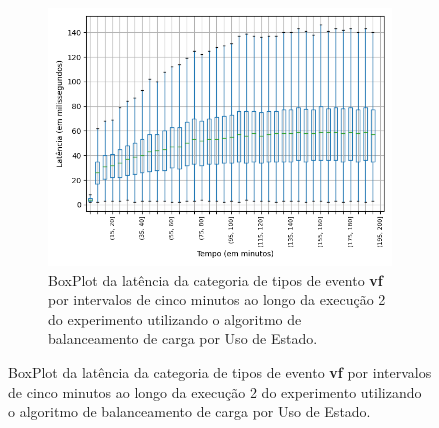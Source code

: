 

\begin{figure}
\centering
\begin{subfigure}{.5\textwidth}
\centering
\includegraphics[width=\textwidth]{figuras/graphics/boxplot_7-dez-su_vf.png}
\caption{BoxPlot da latência da categoria de tipos de evento \textbf{vf} por intervalos de cinco minutos ao longo da execução 2 do experimento utilizando o algoritmo de balanceamento de carga por Uso de Estado.}
\label{fig:BoxPlot_vf_SU_7-dez-su}
\end{subfigure}%


\end{figure}
